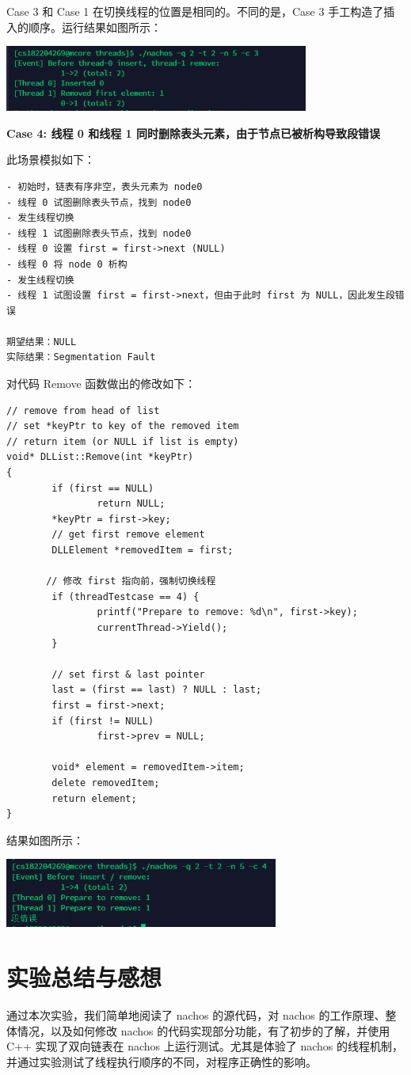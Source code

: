 \documentclass[a4paper,12pt]{article}
\begin{document}
\par Case 3 和 Case 1 在切换线程的位置是相同的。不同的是，Case 3 手工构造了插入的顺序。运行结果如图所示：
\begin{center}
\includegraphics[width=10cm]{images/result/8.png}
\end{center}

\par\textbf{Case 4: 线程 0 和线程 1 同时删除表头元素，由于节点已被析构导致段错误}
\par 此场景模拟如下：
\begin{verbatim}
- 初始时，链表有序非空，表头元素为 node0 
- 线程 0 试图删除表头节点，找到 node0
- 发生线程切换
- 线程 1 试图删除表头节点，找到 node0
- 线程 0 设置 first = first->next (NULL)
- 线程 0 将 node 0 析构
- 发生线程切换
- 线程 1 试图设置 first = first->next，但由于此时 first 为 NULL，因此发生段错误

期望结果：NULL
实际结果：Segmentation Fault
\end{verbatim}

\par 对代码 Remove 函数做出的修改如下：
\begin{verbatim}
// remove from head of list 
// set *keyPtr to key of the removed item 
// return item (or NULL if list is empty) 
void* DLList::Remove(int *keyPtr) 
{ 
        if (first == NULL) 
                return NULL; 
        *keyPtr = first->key; 
        // get first remove element 
        DLLElement *removedItem = first; 
 
       // 修改 first 指向前，强制切换线程
        if (threadTestcase == 4) { 
                printf("Prepare to remove: %d\n", first->key); 
                currentThread->Yield(); 
        } 
 
        // set first & last pointer 
        last = (first == last) ? NULL : last; 
        first = first->next; 
        if (first != NULL) 
                first->prev = NULL; 
 
        void* element = removedItem->item; 
        delete removedItem; 
        return element; 
}
\end{verbatim}

\par 结果如图所示：
\begin{center}
\includegraphics[width=9cm]{images/result/9.png}
\end{center}

\section{实验总结与感想}
\par 通过本次实验，我们简单地阅读了 nachos 的源代码，对 nachos 的工作原理、整体情况，以及如何修改 nachos 的代码实现部分功能，有了初步的了解，并使用 C++ 实现了双向链表在 nachos 上运行测试。尤其是体验了 nachos 的线程机制，并通过实验测试了线程执行顺序的不同，对程序正确性的影响。
\end{document}
